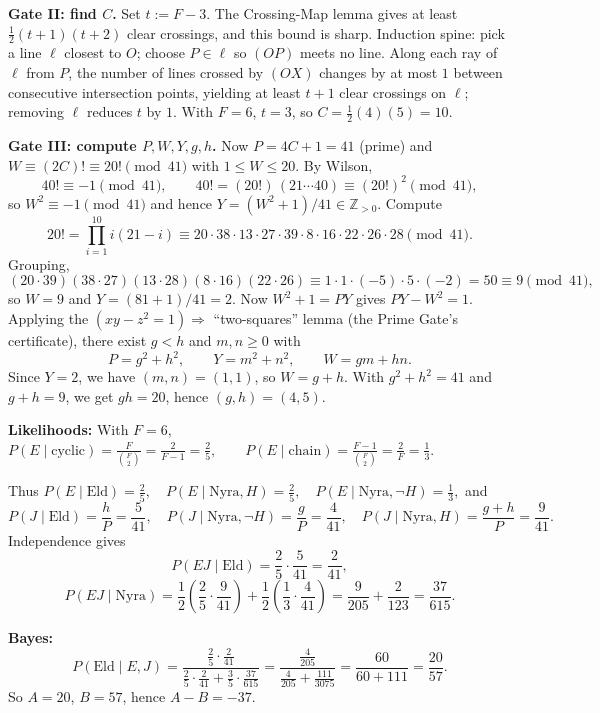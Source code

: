 \medskip
\textbf{Gate II: find \(C\).}
Set \(t:=F-3\). The Crossing-Map lemma gives at least \(\frac12(t+1)(t+2)\) clear crossings, and this bound is sharp.
Induction spine: pick a line \(\ell\) closest to \(O\); choose \(P\in\ell\) so \((OP)\) meets no line.
Along each ray of \(\ell\) from \(P\), the number of lines crossed by \((OX)\) changes by at most \(1\) between consecutive
intersection points, yielding at least \(t+1\) clear crossings on \(\ell\); removing \(\ell\) reduces \(t\) by \(1\).
With \(F=6\), \(t=3\), so
$
C=\frac12(4)(5)=10.
$

\medskip
\textbf{Gate III: compute \(P,W,Y,g,h\).}
Now \(P=4C+1=41\) (prime) and \(W\equiv (2C)!\equiv 20!\pmod{41}\) with \(1\le W\le 20\).
By Wilson,
\[
40!\equiv -1\pmod{41},\qquad 40!=(20!)\,(21\cdots 40)\equiv (20!)^2\pmod{41},
\]
so \(W^2\equiv -1\pmod{41}\) and hence \(Y=(W^2+1)/41\in\mathbb Z_{>0}\).
Compute
\[
20!=\prod_{i=1}^{10} i(21-i)\equiv
20\cdot38\cdot13\cdot27\cdot39\cdot8\cdot16\cdot22\cdot26\cdot28 \pmod{41}.
\]
Grouping,
\[
(20\cdot39)(38\cdot27)(13\cdot28)(8\cdot16)(22\cdot26)\equiv
1\cdot1\cdot(-5)\cdot 5\cdot(-2)=50\equiv 9\pmod{41},
\]
so \(W=9\) and \(Y=(81+1)/41=2\). Now \(W^2+1=PY\) gives \(PY-W^2=1\).
Applying the \((xy-z^2=1)\Rightarrow\) “two-squares” lemma (the Prime Gate’s certificate),
there exist \(g<h\) and \(m,n\ge 0\) with
\[
P=g^2+h^2,\qquad Y=m^2+n^2,\qquad W=gm+hn.
\]
Since \(Y=2\), we have \((m,n)=(1,1)\), so \(W=g+h\).
With \(g^2+h^2=41\) and \(g+h=9\), we get \(gh=20\), hence \((g,h)=(4,5)\).

\medskip
\textbf{Likelihoods: }
With \(F=6\),
$
P(E\mid\text{cyclic})=\frac{F}{\binom{F}{2}}=\frac{2}{F-1}=\frac25,\qquad
P(E\mid\text{chain})=\frac{F-1}{\binom{F}{2}}=\frac{2}{F}=\frac13.
$


Thus
$
P(E\mid\text{Eld})=\frac25,\quad P(E\mid\text{Nyra},H)=\frac25,\quad P(E\mid\text{Nyra},\neg H)=\frac13,
$
and
\[
P(J\mid\text{Eld})=\frac{h}{P}=\frac{5}{41},\quad
P(J\mid\text{Nyra},\neg H)=\frac{g}{P}=\frac{4}{41},\quad
P(J\mid\text{Nyra},H)=\frac{g+h}{P}=\frac{9}{41}.
\]
Independence gives
\[
P(EJ\mid\text{Eld})=\frac25\cdot\frac{5}{41}=\frac{2}{41},
\]
\[
P(EJ\mid\text{Nyra})=\frac12\!\left(\frac25\cdot\frac{9}{41}\right)+\frac12\!\left(\frac13\cdot\frac{4}{41}\right)
=\frac{9}{205}+\frac{2}{123}=\frac{37}{615}.
\]

\medskip
\textbf{Bayes: }
\[
P(\text{Eld}\mid E,J)=
\frac{\frac25\cdot\frac{2}{41}}{\frac25\cdot\frac{2}{41}+\frac35\cdot\frac{37}{615}}
=\frac{\frac{4}{205}}{\frac{4}{205}+\frac{111}{3075}}
=\frac{60}{60+111}
=\frac{20}{57}.
\]
So \(A=20\), \(B=57\), hence \(A-B=-37\).


\NextPage
